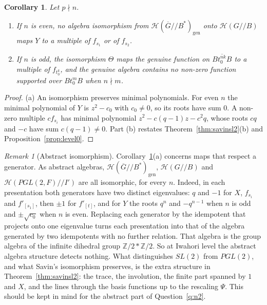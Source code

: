 \documentclass[12pt,letterpaper]{amsart}
\numberwithin{equation}{section}
\newtheorem{corollary}[theorem]{Corollary}
\theoremstyle{definition}
\theoremstyle{remark}
\newtheorem{remark}[theorem]{Remark}
\newcommand{\cH}{\mathcal{H}}
\newcommand{\Z}{\mathbb{Z}}
\newcommand{\Gbar}{\overline{G}}
\newcommand{\gen}{\mathrm{gen}}
\begin{document}
\begin{corollary}
\label{cor:wronggroup}
Let $p\nmid n$.
\begin{enumerate}[leftmargin=2em,label=(\alph*)]
\item If $n$ is even, no algebra isomorphism from
$\cH(\Gbar/\!/B^*)_{\gen}$ onto $\cH(G/\!/B)$ maps $Y$ to a multiple of
$f_{s_1}$ or of $f_{s_2}$.
\item If $n$ is odd, the isomorphism $\Theta$ maps the genuine function
on $\overline{Bt_0^{nk}B}$ to a multiple of $f_{t_0^k}$, and the genuine
algebra contains no non-zero function supported over $Bt_0^mB$ when
$n\nmid m$.
\end{enumerate}
\end{corollary}

\begin{proof}
(a) An isomorphism preserves minimal polynomials. For even $n$ the
minimal polynomial of $Y$ is $z^2-c_0$ with $c_0\neq 0$, so its roots
have sum $0$. A non-zero multiple $cf_{s_i}$ has minimal polynomial
$z^2-c(q-1)z-c^2q$, whose roots $cq$ and $-c$ have sum $c(q-1)\neq 0$.
Part (b) restates Theorem~\ref{thm:savinsl2}(b) and
Proposition~\ref{prop:level0}.
\end{proof}

\begin{remark}[Abstract isomorphism]
\label{rem:abstract}
Corollary~\ref{cor:wronggroup}(a) concerns maps that respect a
generator. As abstract algebras, $\cH(\Gbar/\!/B^*)_{\gen}$,
$\cH(G/\!/B)$ and $\cH(PGL(2,F)/\!/I')$ are all isomorphic, for every
$n$. Indeed, in each presentation both generators have two distinct
eigenvalues: $q$ and $-1$ for $X$, $f_{s_i}$ and $f'_{[s_1]}$, then
$\pm1$ for $f'_{[t]}$, and for $Y$ the roots $q^n$ and $-q^{n-1}$ when
$n$ is odd and $\pm\sqrt{c_0}$ when $n$ is even. Replacing each
generator by the idempotent that projects onto one eigenvalue turns
each presentation into that of the algebra generated by two idempotents
with no further relation. That algebra is the group algebra of the
infinite dihedral group $\Z/2*\Z/2$. So at Iwahori level the abstract
algebra structure detects nothing. What distinguishes $SL(2)$ from
$PGL(2)$, and what Savin's isomorphism preserves, is the extra
structure in Theorem~\ref{thm:savinsl2}: the trace, the involution, the
finite part spanned by $1$ and $X$, and the lines through the basis
functions up to the rescaling $\Psi$. This should be kept in mind for
the abstract part of Question~\ref{q:n2}.
\end{remark}
\end{document}
